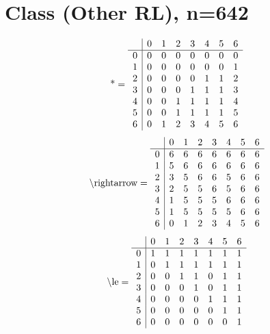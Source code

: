 \documentclass[11pt]{article}
\begin{document}
\section{Class (Other RL), n=642}
\[\text{*} = 
\begin{array}{r | r r r r r r r}
 & 0 & 1 & 2 & 3 & 4 & 5 & 6 \\ \hline
0 & 0 & 0 & 0 & 0 & 0 & 0 & 0 \\
1 & 0 & 0 & 0 & 0 & 0 & 0 & 1 \\
2 & 0 & 0 & 0 & 0 & 1 & 1 & 2 \\
3 & 0 & 0 & 0 & 1 & 1 & 1 & 3 \\
4 & 0 & 0 & 1 & 1 & 1 & 1 & 4 \\
5 & 0 & 0 & 1 & 1 & 1 & 1 & 5 \\
6 & 0 & 1 & 2 & 3 & 4 & 5 & 6 \\
\end{array}
\]
\[\text{\textbackslash rightarrow} = 
\begin{array}{r | r r r r r r r}
 & 0 & 1 & 2 & 3 & 4 & 5 & 6 \\ \hline
0 & 6 & 6 & 6 & 6 & 6 & 6 & 6 \\
1 & 5 & 6 & 6 & 6 & 6 & 6 & 6 \\
2 & 3 & 5 & 6 & 6 & 5 & 6 & 6 \\
3 & 2 & 5 & 5 & 6 & 5 & 6 & 6 \\
4 & 1 & 5 & 5 & 5 & 6 & 6 & 6 \\
5 & 1 & 5 & 5 & 5 & 5 & 6 & 6 \\
6 & 0 & 1 & 2 & 3 & 4 & 5 & 6 \\
\end{array}
\]
\[\text{\textbackslash le} = 
\begin{array}{r | r r r r r r r}
 & 0 & 1 & 2 & 3 & 4 & 5 & 6 \\ \hline
0 & 1 & 1 & 1 & 1 & 1 & 1 & 1 \\
1 & 0 & 1 & 1 & 1 & 1 & 1 & 1 \\
2 & 0 & 0 & 1 & 1 & 0 & 1 & 1 \\
3 & 0 & 0 & 0 & 1 & 0 & 1 & 1 \\
4 & 0 & 0 & 0 & 0 & 1 & 1 & 1 \\
5 & 0 & 0 & 0 & 0 & 0 & 1 & 1 \\
6 & 0 & 0 & 0 & 0 & 0 & 0 & 1 \\
\end{array}
\]
\end{document}
